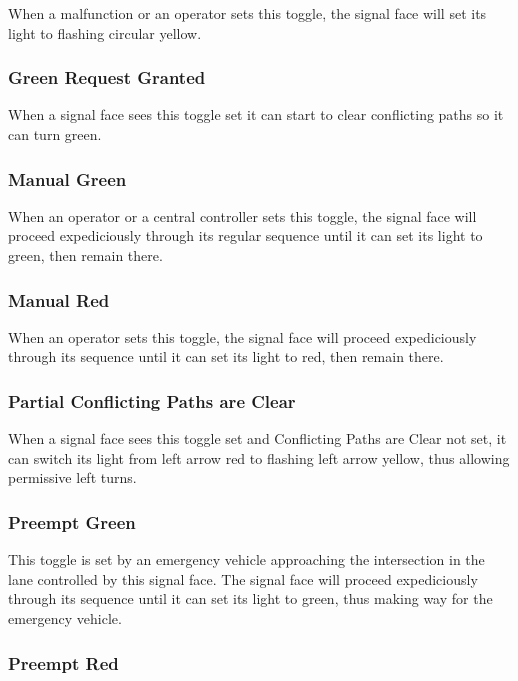 \documentclass[letterpaper,twoside]{article}
\begin{document}
When a malfunction or an operator sets this toggle, the signal face
will set its light to flashing circular yellow.

\subsubsection{Green Request Granted}

When a signal face sees this toggle set it can start to clear conflicting
paths so it can turn green.

\subsubsection{Manual Green}

When an operator or a central controller sets this toggle,
the signal face will proceed
expediciously through its regular sequence until it can set its light to
green, then remain there.

\subsubsection{Manual Red}

When an operator sets this toggle, the signal face will proceed
expediciously through its sequence until it can set its light to
red, then remain there.

\subsubsection{Partial Conflicting Paths are Clear}

When a signal face sees this toggle set and Conflicting Paths are Clear
not set, it can switch its light from left arrow red to flashing left arrow
yellow, thus allowing permissive left turns.

\subsubsection{Preempt Green}

This toggle is set by an emergency vehicle approaching the intersection
in the lane controlled by this signal face.  The signal face will proceed
expediciously through its sequence until it can set its light to
green, thus making way for the emergency vehicle.

\subsubsection{Preempt Red}
\end{document}
